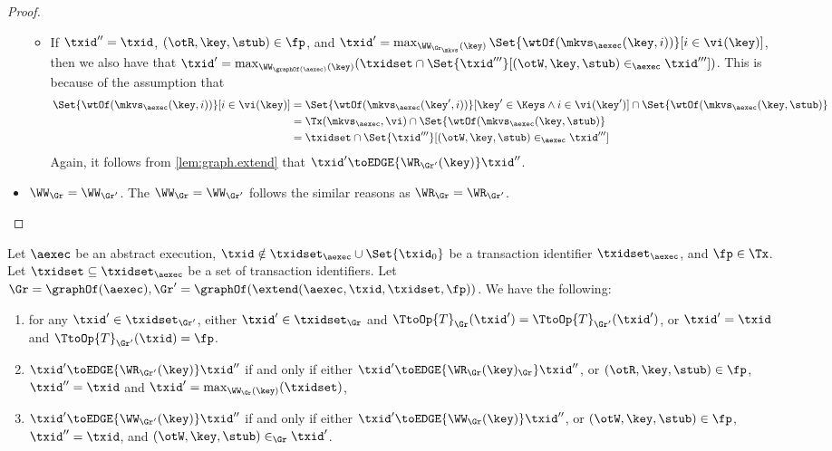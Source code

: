 \begin{proof}
\begin{itemize}
\begin{itemize}
\item If $\txid'' = \txid$, $(\otR, \key, \stub) \in \fp$, and $\txid' = \max_{\WW_{\Gr_\mkvs}(\key)} \Set{\wtOf(\mkvs_{\aexec}(\key, i))}[i \in \vi(\key)]$, 
    then we also have that $\txid' = \max_{\WW_{\graphOf(\aexec)}(\key)} (\txidset \cap \Set{\txid'''}[(\otW, \key, \stub) \in_{\aexec} \txid''']) $. 
This is because of the assumption that 
\begin{align*}
    \Set{\wtOf(\mkvs_{\aexec}(\key, i))}[i \in \vi(\key)]
    & = \Set{\wtOf(\mkvs_{\aexec}(\key', i))}[\key' \in \Keys \land i \in \vi(\key')] \cap \Set{\wtOf(\mkvs_{\aexec}(\key, \stub)} \\
    & = \Tx(\mkvs_{\aexec}, \vi) \cap \Set{\wtOf(\mkvs_{\aexec}(\key, \stub)}  \\
    & = \txidset \cap \Set{\txid'''}[(\otW, \key, \stub) \in_{\aexec} \txid''']
\end{align*}
Again, it follows from \cref{lem:graph.extend} that $\txid' \toEDGE{\WR_{\Gr'}(\key)} \txid''$. 
\end{itemize}
\item \( \WW_{\Gr} = \WW_{\Gr'}\). The \( \WW_{\Gr} = \WW_{\Gr'} \) follows the similar reasons as $\WR_{\Gr} = \WR_{\Gr'}$.
\end{itemize}
\end{proof}

\begin{lemma}
\label{lem:graph.extend}
Let $\aexec$ be an abstract execution, 
$\txid \notin \txidset_{\aexec} \cup \Set{\txid_0}$ be a transaction identifier $\txidset_{\aexec}$, and $\fp \in \Tx$. 
Let $\txidset \subseteq \txidset_{\aexec}$ be a set of transaction identifiers.
Let $\Gr = \graphOf(\aexec), \Gr' = \graphOf(\extend(\aexec, \txid, \txidset, \fp))$. 
We have the following: 
\begin{enumerate}
\item for any $\txid' \in \txidset_{\Gr'}$, either $\txid' \in \txidset_{\Gr}$ and $\TtoOp{T}_{\Gr}(\txid') = \TtoOp{T}_{\Gr'}(\txid')$, 
or $\txid' = \txid$ and $\TtoOp{T}_{\Gr'}(\txid) = \fp$.
\item $\txid' \toEDGE{\WR_{\Gr'}(\key)} \txid''$ if and only if either 
$\txid' \toEDGE{\WR_{\Gr}(\key)_{\Gr}} \txid''$, or $(\otR, \key, \stub) \in \fp$, $\txid'' = \txid$ and 
$\txid' = \max_{\WW_{\Gr}(\key)}(\txidset)$, 
\item $\txid' \toEDGE{\WW_{\Gr'}(\key)} \txid''$ if and only if 
either $\txid' \toEDGE{\WW_{\Gr}(\key)} \txid''$, or $(\otW, \key, \stub) \in \fp$, $\txid'' = \txid$, 
and $(\otW, \key, \stub) \in_{\Gr} \txid'$.
\end{enumerate}
\end{lemma}

